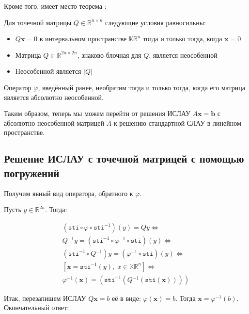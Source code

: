 Кроме того, имеет место теорема \cite[Лекция 11]{intv}:

\begin{theorem}
	Для точечной матрицы $Q \in \mathbb{R}^{n \times n}$ следующие условия равносильны:
	\begin{itemize}
		\item $Q\mathbf{x} = 0$ в интервальном пространстве $\mathbb{KR}^{n}$ тогда и только тогда, когда $\mathbf{x} = 0$
		
		\item Матрица $Q\tilde{} \in \mathbb{R}^{2n \times 2n}$, знаково-блочная для $Q$, является неособенной
		
		\item Неособенной является $|Q|$
	\end{itemize}
\end{theorem}

\begin{corollary}
	Оператор $\varphi$, введённый ранее, необратим тогда и только тогда, когда его матрица является абсолютно неособенной.
\end{corollary}

Таким образом, теперь мы можем перейти от решения ИСЛАУ $A\mathbf{x}=\mathbf{b}$ с абсолютно неособенной матрицей $A$ к решению стандартной СЛАУ в линейном пространстве. 

\subsection{Решение ИСЛАУ с точечной матрицей с помощью погружений}
Получим явный вид оператора, обратного к $\varphi$.

Пусть $y \in \mathbb{R}^{2n}$. Тогда:

\begin{align}
(\mathtt{sti} \circ \varphi \circ \mathtt{sti}^{-1})(y) = Q\tilde{}y \Leftrightarrow \\
Q\tilde{}^{-1}y = (\mathtt{sti} ^ {-1} \circ \varphi^{-1} \circ \mathtt{sti})(y) \Leftrightarrow \\
(\mathtt{sti} ^ {-1} \circ Q\tilde{}^{-1})y = (\varphi^{-1} \circ \mathtt{sti})(y) \Leftrightarrow \\
[\mathbf{x} = \mathtt{sti}^{-1}(y), \; x \in \mathbb{KR}^n] \Leftrightarrow \\
\varphi^{-1}(\mathbf{x}) = (\mathtt{sti} ^ {-1}( Q\tilde{}^{-1}(\mathtt{sti}(\mathbf{x}))))
\end{align}

Итак, перезапишем ИСЛАУ $Q\mathbf{x} = b$ её в виде: $\varphi(\mathbf{x})=b$. Тогда $\mathbf{x} = \varphi^{-1}(b)$. Окончательный ответ:

